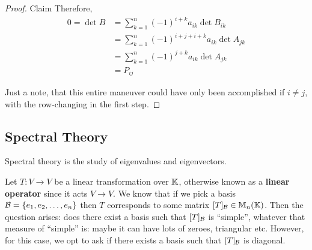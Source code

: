 \begin{proof} {Claim}
    Therefore, \begin{align*}
        0 = \det B & = \sum_{k=1}^{n} (-1)^{i+k}a_{ik}\det B_{ik}    \\
                   & = \sum_{k=1}^{n}(-1)^{i+j+i+k}a_{ik}\det A_{jk} \\
                   & = \sum_{k=1}^{n}(-1)^{j+k}a_{ik}\det A_{jk}     \\
                   & = P_{ij}
    \end{align*}

    Just a note, that this entire maneuver could have only been accomplished if \(i \neq j\), with the row-changing in the first step.
\end{proof}

\subsection{Spectral Theory}
\begin{motivation}
    Spectral theory is the study of eigenvalues and eigenvectors.

    Let \(T: V \to V\) be a linear transformation over \(\mathbb{K}\), otherwise known as a \textbf{linear operator} since it acts \(V \to V\). We know that if we pick a basis \(\mathcal{B} = \{e_1, e_2, \dots, e_n\}\) then \(T \) corresponds to some matrix \([T]_{\mathcal{B}} \in \mathbb{M}_n(\mathbb{K}) \). Then the question arises: does there exist a basis such that \([T]_{\mathcal{B}}\) is ``simple'', whatever that measure of ``simple'' is: maybe it can have lots of zeroes, triangular etc. However, for this case, we opt to ask if there exists a basis such that \([T]_{\mathcal{B}}\) is diagonal.
\end{motivation}


